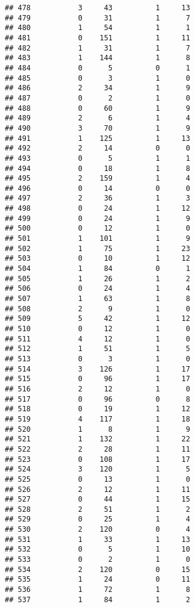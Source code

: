 \documentclass[]{article}
\begin{document}
\begin{verbatim}
## 478           3     43          1     13
## 479           0     31          1      7
## 480           1     54          1      1
## 481           0    151          1     11
## 482           1     31          1      7
## 483           1    144          1      8
## 484           0      5          0      1
## 485           0      3          1      0
## 486           2     34          1      9
## 487           0      2          1      0
## 488           0     60          1      9
## 489           2      6          1      4
## 490           3     70          1      9
## 491           1    125          1     13
## 492           2     14          0      0
## 493           0      5          1      1
## 494           0     18          1      8
## 495           2    159          1      4
## 496           0     14          0      0
## 497           2     36          1      3
## 498           0     24          1     12
## 499           0     24          1      9
## 500           0     12          1      0
## 501           1    101          1      9
## 502           1     75          1     23
## 503           0     10          1     12
## 504           1     84          0      1
## 505           1     26          1      2
## 506           0     24          1      4
## 507           1     63          1      8
## 508           2      9          1      0
## 509           5     42          1     12
## 510           0     12          1      0
## 511           4     12          1      0
## 512           1     51          1      5
## 513           0      3          1      0
## 514           3    126          1     17
## 515           0     96          1     17
## 516           2     12          1      0
## 517           0     96          0      8
## 518           0     19          1     12
## 519           4    117          1     18
## 520           1      8          1      9
## 521           1    132          1     22
## 522           2     28          1     11
## 523           0    108          1     17
## 524           3    120          1      5
## 525           0     13          1      0
## 526           2     12          1     11
## 527           0     44          1     15
## 528           2     51          1      2
## 529           0     25          1      4
## 530           2    120          0      4
## 531           1     33          1     13
## 532           0      5          1     10
## 533           0      2          1      0
## 534           2    120          0     15
## 535           1     24          0     11
## 536           1     72          1      8
## 537           1     84          1      2

\end{verbatim}
\end{document}
